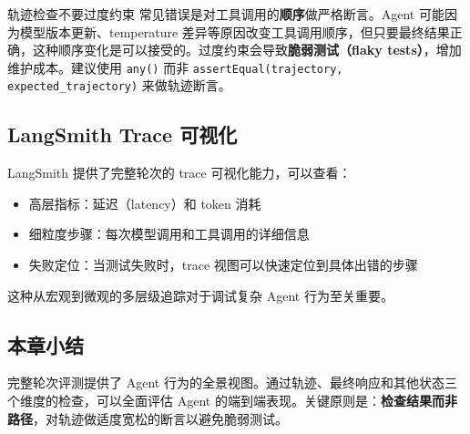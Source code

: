 \begin{warningbox}{轨迹检查不要过度约束}
常见错误是对工具调用的\textbf{顺序}做严格断言。Agent 可能因为模型版本更新、temperature 差异等原因改变工具调用顺序，但只要最终结果正确，这种顺序变化是可以接受的。过度约束会导致\textbf{脆弱测试（flaky tests）}，增加维护成本。建议使用 \texttt{any()} 而非 \texttt{assertEqual(trajectory, expected\_trajectory)} 来做轨迹断言。
\end{warningbox}

\subsection{LangSmith Trace 可视化}

LangSmith 提供了完整轮次的 trace 可视化能力，可以查看：

\begin{itemize}
  \item 高层指标：延迟（latency）和 token 消耗
  \item 细粒度步骤：每次模型调用和工具调用的详细信息
  \item 失败定位：当测试失败时，trace 视图可以快速定位到具体出错的步骤
\end{itemize}

这种从宏观到微观的多层级追踪对于调试复杂 Agent 行为至关重要。

\subsection{本章小结}

完整轮次评测提供了 Agent 行为的全景视图。通过轨迹、最终响应和其他状态三个维度的检查，可以全面评估 Agent 的端到端表现。关键原则是：\textbf{检查结果而非路径}，对轨迹做适度宽松的断言以避免脆弱测试。


